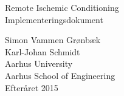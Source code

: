 \thispagestyle{empty} %


\colorbox{usDef}{
	\parbox[t]{1.0\linewidth}{
		\centering \fontsize{30pt}{50pt}\selectfont %
		\vspace*{0.7cm} %
		
		\hfill Remote Ischemic Conditioning\\
		\hfill Implementeringsdokument \\
		
		\vspace*{0.7cm} %
	}
}

\vfill %


{\centering \large 
	\hfill Simon Vammen Grønbæk \\
	\hfill Karl-Johan Schmidt\\
	\hfill Aarhus University \\
	\hfill Aarhus School of Engineering\\
	\hfill Efteråret 2015 \\
}

\clearpage %